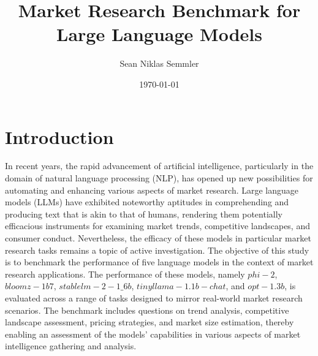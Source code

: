 \documentclass[12pt,a4paper]{article}
\title{Market Research Benchmark for Large Language Models}
\author{Sean Niklas Semmler}
\date{\today}
\begin{document}
	
	\maketitle
	
	
	\section{Introduction}
	In recent years, the rapid advancement of artificial intelligence, particularly in the domain of natural language processing (NLP), has opened up new possibilities for automating and enhancing various aspects of market research. Large language models (LLMs) have exhibited noteworthy aptitudes in comprehending and producing text that is akin to that of humans, rendering them potentially efficacious instruments for examining market trends, competitive landscapes, and consumer conduct. Nevertheless, the efficacy of these models in particular market research tasks remains a topic of active investigation.
	The objective of this study is to benchmark the performance of five language models in the context of market research applications. The performance of these models, namely $phi-2$, $bloomz-1b7$, $stablelm-2-1\_6b$, $tinyllama-1.1b-chat$, and $opt-1.3b$, is evaluated across a range of tasks designed to mirror real-world market research scenarios. The benchmark includes questions on trend analysis, competitive landscape assessment, pricing strategies, and market size estimation, thereby enabling an assessment of the models' capabilities in various aspects of market intelligence gathering and analysis.
\end{document}
